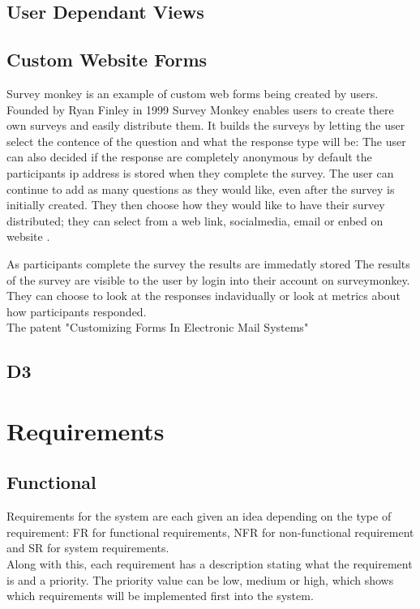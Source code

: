 \documentclass[12pt]{article}  %
\begin{document}
\subsection{User Dependant Views}


\subsection{Custom Website Forms}
Survey monkey \cite{finley_surveymonkey_1999} is an example of custom web forms being created by users. Founded by Ryan Finley in 1999 Survey Monkey enables users to create there own surveys and easily distribute them. It builds the surveys by letting the user select the contence of the question and what the response type will be: The user can also decided if the response are completely anonymous by default the participants ip address is stored when they complete the survey. The user can continue to add as many questions as they would like, even after the survey is initially created. They then choose how they would like to have their survey distributed; they can select from a web link, socialmedia, email or enbed on website .  

As participants complete the survey the results are immedatly stored
The results of the survey are visible to the user by login into their account on surveymonkey. They can choose to look at the responses indavidually or look at metrics about how participants responded. \\

\noindent
The patent "Customizing Forms In Electronic Mail Systems" \cite{holt_customizing_2006}


\subsection{D3}
\cite{bostock_d3.js_????}





\newpage
\section{Requirements}
 


\subsection{Functional}
Requirements for the system are each given an idea depending on the type of requirement: FR for functional requirements, NFR for non-functional requirement and SR for system requirements.\\
Along with this, each requirement has a description stating what the requirement is and a priority. The priority value can be low, medium or high, which shows which requirements will be implemented first into the system.
\end{document}
